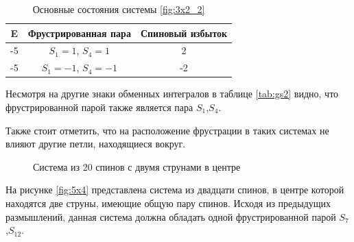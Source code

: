 \documentclass[utf8, babel, sor, jor, amsmath, amssymb, reprint]{elsarticle} %
\begin{document}
\begin{table}[h]
	\centering
	\begin{tabular}{|c|c|c|}
		\hline
		E   &   Фрустрированная пара & Спиновый избыток \\
		\hline
		-5   &  $S_1=1$, $S_4=1$ & 2 \\
		\hline
		-5   &   $S_1=-1$, $S_4=-1$ & -2 \\
		\hline
	\end{tabular}
	\caption{Основные состояния системы \eqref{fig:3x2_2}}
	\label{tab:gs2}
\end{table}

Несмотря на другие знаки обменных интегралов в таблице \eqref{tab:gs2} видно, что фрустрированной парой также является пара $S_1$,$S_4$.

Также стоит отметить, что на расположение фрустрации в таких системах  не влияют другие петли, находящиеся вокруг.

\begin{figure}[h]
	\centering
	\caption{Система из 20 спинов с двумя струнами в центре}
	\label{fig:5x4}
\end{figure}

На рисунке \eqref{fig:5x4} представлена система из двадцати спинов, в центре которой находятся две струны, имеющие общую пару спинов. Исходя из предыдущих размышлений, данная система должна обладать одной фрустрированной парой  $S_7$,$S_12$.
\end{document}

